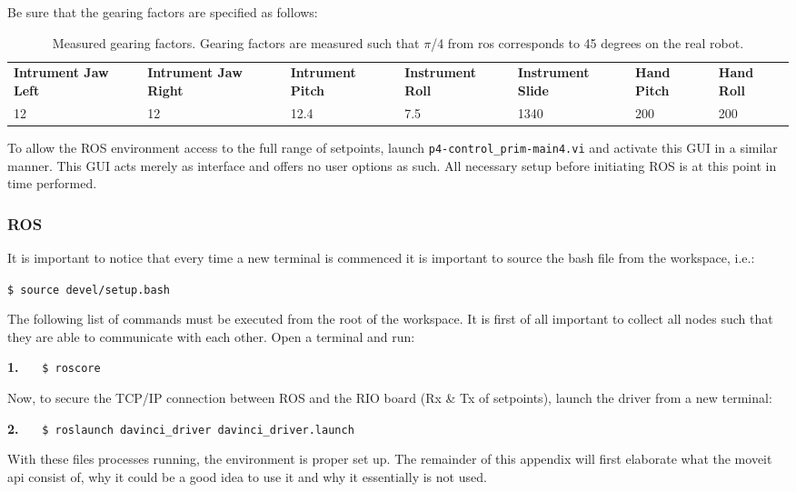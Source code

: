 Be sure that the gearing factors are specified as follows:
\begin{table}[H]
\begin{tabularx}{\textwidth}{X X X X X X X}
\rowcolor{HeaderBlue} 
\scriptsize \textbf{Intrument Jaw Left} &\scriptsize  \textbf{Intrument Jaw Right} &\scriptsize  \textbf{Intrument Pitch} &\scriptsize  \textbf{Instrument Roll} &\scriptsize  \textbf{Instrument Slide} & \scriptsize   \textbf{Hand Pitch} &  \scriptsize\textbf{Hand Roll}\\
12 & 12 & 12.4 & 7.5 & 1340 & 200 & 200\\
\end{tabularx}
	\caption{Measured gearing factors. Gearing factors are measured such that $\pi$/4 from \gls{ros} corresponds to 45 degrees on the real robot.}
\label{tab:gearing}
\end{table}
To allow the ROS environment access to the full range of setpoints, launch \texttt{p4-control\_prim-main4.vi} and activate this GUI in a similar manner. This GUI acts merely as interface and offers no user options as such. All necessary setup before initiating ROS is at this point in time performed.
\subsubsection*{ROS}
It is important to notice that every time a new terminal is commenced it is important to source the bash file from the workspace, i.e.:

\hspace{1cm} \texttt{\$ source devel/setup.bash}

The following list of commands must be executed from the root of the workspace. It is first of all important to collect all \gls{node}s such that they are able to communicate with each other. Open a terminal and run:

\hspace{1cm} \textbf{1.} \ \ \ \texttt{\$ roscore} \ \ \ {}

Now, to secure the TCP/IP connection between ROS and the RIO board (Rx \& Tx of setpoints), launch the driver from a new terminal:

\hspace{1cm} \textbf{2.} \ \ \  \texttt{\$ roslaunch davinci\_driver davinci\_driver.launch} \ \ \ {} 

With these files processes running, the environment is proper set up. The remainder of this appendix will first elaborate what the moveit \gls{api} consist of, why it could be a good idea to use it and why it essentially is not used.
